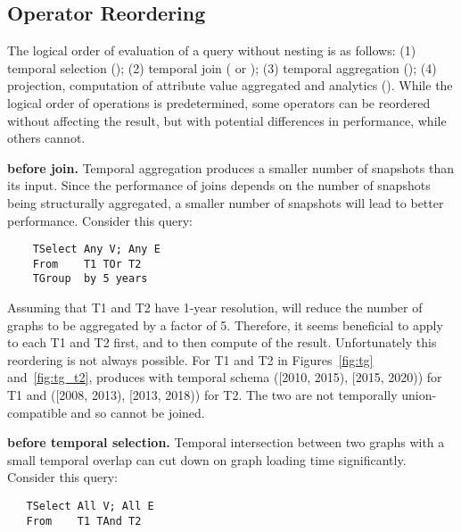 \subsection{Operator Reordering}
\label{sec:sys:optimization}

The logical order of evaluation of a \ql query without nesting is as
follows: (1) temporal selection (); (2) temporal join
( or ); (3) temporal aggregation
(); (4) projection, computation of attribute value
aggregated and analytics ().  While the logical order
of operations is predetermined, some operators can be reordered
without affecting the result, but with potential differences in
performance, while others cannot. 

{\bf {} before join.}  Temporal aggregation produces a
smaller number of snapshots than its input.  Since the performance of
joins depends on the number of snapshots being structurally
aggregated, a smaller number of snapshots will lead to better
performance.  Consider this query:

\begin{small}
\begin{verbatim}
    TSelect Any V; Any E
    From    T1 TOr T2
    TGroup  by 5 years
\end{verbatim}
\end{small}

Assuming that T1 and T2 have 1-year resolution,  will
reduce the number of graphs to be aggregated by a factor of 5.
Therefore, it seems beneficial to apply  to each T1 and
T2 first, and to then compute  of the result.  Unfortunately
this reordering is not always possible.  For T1 and T2 in
Figures~\ref{fig:tg} and~\ref{fig:tg_t2},  produces \tgs
with temporal schema ([2010, 2015), [2015, 2020)) for T1 and ([2008,
      2013), [2013, 2018)) for T2.  The two \tgs are not temporally
        union-compatible and so cannot be joined.

{\bf {} before temporal selection.}  Temporal intersection
between two graphs with a small temporal overlap can cut down on graph
loading time significantly.  Consider this query:

\begin{small}
\begin{verbatim}
   TSelect All V; All E
   From    T1 TAnd T2
\end{verbatim}
\end{small}

